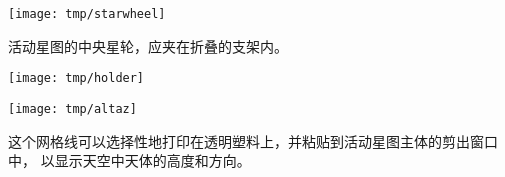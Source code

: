 \documentclass[a4paper,onecolumn,10pt]{article}
\begin{document}
\newpage

\centerline{\texttt{[image: tmp/starwheel]}}

\vspace{1cm}
活动星图的中央星轮，应夹在折叠的支架内。

\newpage
\thispagestyle{empty}
\vspace*{-3.0cm}
\centerline{\texttt{[image: tmp/holder]}}
\newpage

\centerline{\texttt{[image: tmp/altaz]}}

\vspace{1cm}
这个网格线可以选择性地打印在透明塑料上，并粘贴到活动星图主体的剪出窗口中，
以显示天空中天体的高度和方向。
\end{document}
